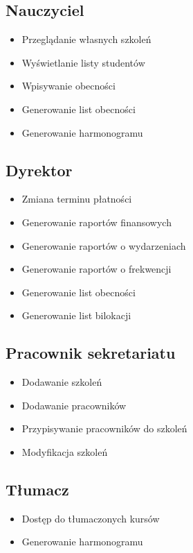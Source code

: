 \documentclass[11pt,a4paper]{article}
\begin{document}
\subsection{Nauczyciel}
\begin{itemize}
    \item Przeglądanie własnych szkoleń
    \item Wyświetlanie listy studentów
    \item Wpisywanie obecności
    \item Generowanie list obecności
    \item Generowanie harmonogramu
\end{itemize}

\subsection{Dyrektor} 
\begin{itemize}
    \item Zmiana terminu płatności
    \item Generowanie raportów finansowych
    \item Generowanie raportów o wydarzeniach
    \item Generowanie raportów o frekwencji
    \item Generowanie list obecności       
    \item Generowanie list bilokacji
\end{itemize}

\subsection{Pracownik sekretariatu}
\begin{itemize}
    \item Dodawanie szkoleń
    \item Dodawanie pracowników
    \item Przypisywanie pracowników do szkoleń
    \item Modyfikacja szkoleń
    
\end{itemize}

\subsection{Tłumacz}
\begin{itemize}
    \item Dostęp do tłumaczonych kursów
    \item Generowanie harmonogramu
\end{itemize}
\end{document}
